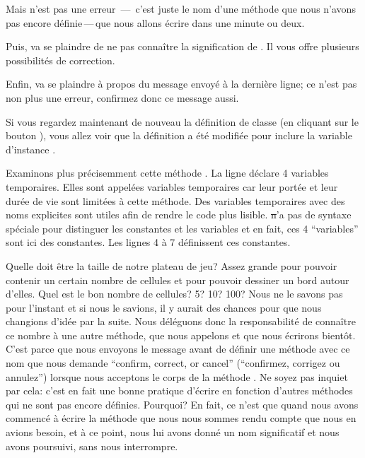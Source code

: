 \documentclass[a4paper,10pt,twoside]{book}
\begin{document}
Mais  n'est pas une erreur \,---\, c'est juste le nom d'une méthode que nous n'avons pas encore définie\,---\,que nous allons \'ecrire dans une minute ou deux.


Puis, \sq va se plaindre de ne pas connaître la signification de . Il vous offre plusieurs possibilités de correction.

Enfin, \sq va se plaindre à propos du message 
envoyé à la dernière ligne; ce n'est pas non plus une erreur,
confirmez donc ce message aussi.

Si vous regardez maintenant de nouveau la définition de classe (en cliquant sur le bouton ), vous allez voir que la définition a été modifiée pour inclure la variable d'instance .

Examinons plus précisemment cette méthode .
La ligne  déclare 4 variables temporaires. Elles sont appelées variables temporaires car leur portée et leur durée de vie sont limitées à cette méthode. Des variables temporaires avec des noms explicites sont utiles afin de rendre le code plus lisible. \st n'a pas de syntaxe spéciale pour distinguer les constantes et les variables et en fait, ces 4 ``variables'' sont ici des constantes. Les lignes 4 à 7 définissent ces constantes.

Quelle doit \^etre la taille de notre plateau de jeu? Assez grande pour pouvoir contenir un certain nombre de cellules et pour pouvoir dessiner un bord autour d'elles.
Quel est le bon nombre de cellules? 5? 10? 100? Nous ne le savons pas
pour l'instant et si nous le savions, il y aurait des chances pour que
nous changions d'idée par la suite. Nous déléguons donc la
responsabilité de connaître ce nombre à une autre méthode, que nous
appelons  et que nous écrirons 
bient\^ot.
C'est parce que nous envoyons le message  avant de
définir une méthode avec ce nom que \sq nous demande ``confirm,
correct, or cancel'' (\cad ``confirmez, corrigez ou annulez'') lorsque nous acceptons le corps de la méthode .
Ne soyez pas inquiet par cela: c'est en fait une bonne pratique d'écrire en fonction d'autres méthodes qui ne sont pas encore définies.
Pourquoi? En fait, ce n'est que quand nous avons commencé à écrire la
méthode  que nous nous sommes rendu compte que nous en
avions besoin, et à ce point, nous lui avons donné un nom 
significatif et nous avons poursuivi, sans nous interrompre.
 
\end{document}
